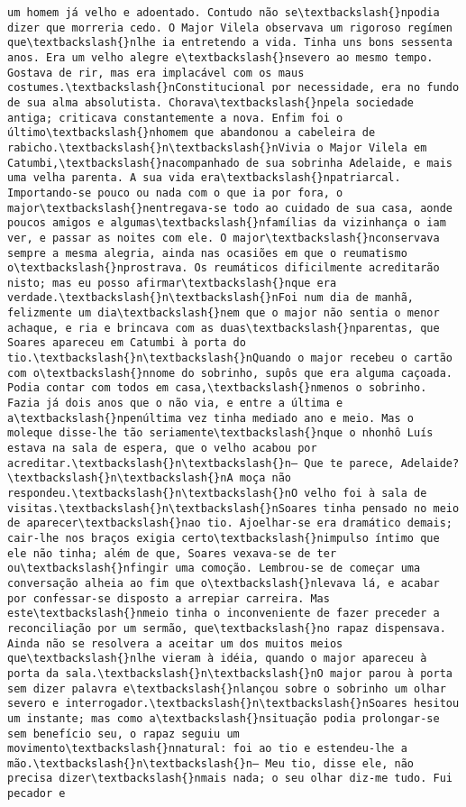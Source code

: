 \begin{Verbatim}[commandchars=\\\{\}]
um homem já velho e adoentado. Contudo não se\textbackslash{}npodia dizer que morreria cedo. O Major Vilela observava um rigoroso regímen que\textbackslash{}nlhe ia entretendo a vida. Tinha uns bons sessenta anos. Era um velho alegre e\textbackslash{}nsevero ao mesmo tempo. Gostava de rir, mas era implacável com os maus costumes.\textbackslash{}nConstitucional por necessidade, era no fundo de sua alma absolutista. Chorava\textbackslash{}npela sociedade antiga; criticava constantemente a nova. Enfim foi o último\textbackslash{}nhomem que abandonou a cabeleira de rabicho.\textbackslash{}n\textbackslash{}nVivia o Major Vilela em Catumbi,\textbackslash{}nacompanhado de sua sobrinha Adelaide, e mais uma velha parenta. A sua vida era\textbackslash{}npatriarcal. Importando-se pouco ou nada com o que ia por fora, o major\textbackslash{}nentregava-se todo ao cuidado de sua casa, aonde poucos amigos e algumas\textbackslash{}nfamílias da vizinhança o iam ver, e passar as noites com ele. O major\textbackslash{}nconservava sempre a mesma alegria, ainda nas ocasiões em que o reumatismo o\textbackslash{}nprostrava. Os reumáticos dificilmente acreditarão nisto; mas eu posso afirmar\textbackslash{}nque era verdade.\textbackslash{}n\textbackslash{}nFoi num dia de manhã, felizmente um dia\textbackslash{}nem que o major não sentia o menor achaque, e ria e brincava com as duas\textbackslash{}nparentas, que Soares apareceu em Catumbi à porta do tio.\textbackslash{}n\textbackslash{}nQuando o major recebeu o cartão com o\textbackslash{}nnome do sobrinho, supôs que era alguma caçoada. Podia contar com todos em casa,\textbackslash{}nmenos o sobrinho. Fazia já dois anos que o não via, e entre a última e a\textbackslash{}npenúltima vez tinha mediado ano e meio. Mas o moleque disse-lhe tão seriamente\textbackslash{}nque o nhonhô Luís estava na sala de espera, que o velho acabou por acreditar.\textbackslash{}n\textbackslash{}n— Que te parece, Adelaide?\textbackslash{}n\textbackslash{}nA moça não respondeu.\textbackslash{}n\textbackslash{}nO velho foi à sala de visitas.\textbackslash{}n\textbackslash{}nSoares tinha pensado no meio de aparecer\textbackslash{}nao tio. Ajoelhar-se era dramático demais; cair-lhe nos braços exigia certo\textbackslash{}nimpulso íntimo que ele não tinha; além de que, Soares vexava-se de ter ou\textbackslash{}nfingir uma comoção. Lembrou-se de começar uma conversação alheia ao fim que o\textbackslash{}nlevava lá, e acabar por confessar-se disposto a arrepiar carreira. Mas este\textbackslash{}nmeio tinha o inconveniente de fazer preceder a reconciliação por um sermão, que\textbackslash{}no rapaz dispensava. Ainda não se resolvera a aceitar um dos muitos meios que\textbackslash{}nlhe vieram à idéia, quando o major apareceu à porta da sala.\textbackslash{}n\textbackslash{}nO major parou à porta sem dizer palavra e\textbackslash{}nlançou sobre o sobrinho um olhar severo e interrogador.\textbackslash{}n\textbackslash{}nSoares hesitou um instante; mas como a\textbackslash{}nsituação podia prolongar-se sem benefício seu, o rapaz seguiu um movimento\textbackslash{}nnatural: foi ao tio e estendeu-lhe a mão.\textbackslash{}n\textbackslash{}n— Meu tio, disse ele, não precisa dizer\textbackslash{}nmais nada; o seu olhar diz-me tudo. Fui pecador e 
\end{Verbatim}
